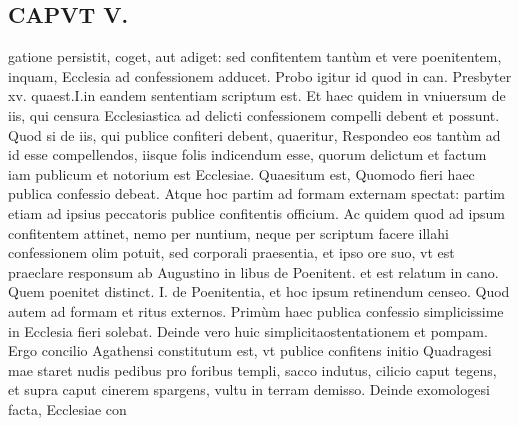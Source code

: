 \documentclass{article}
\begin{document}
\begin{pages}
\section*{CAPVT  V. }
\marginpar{[ p.323 ]}\pstart gatione persistit, coget, aut adiget: sed confitentem tantùm et vere poenitentem, inquam, Ecclesia ad confessionem adducet. Probo igitur id quod in can. Presbyter xv. quaest.I.in eandem sententiam scriptum est. Et haec quidem in vniuersum de iis, qui censura Ecclesiastica ad delicti confessionem compelli debent et possunt. Quod si de iis, qui publice confiteri debent, quaeritur, Respondeo eos tantùm ad id esse compellendos, iisque folis indicendum esse, quorum delictum et factum iam publicum et notorium est Ecclesiae.  \pend\pstart Quaesitum est, Quomodo fieri haec publica confessio debeat. Atque hoc partim ad formam externam spectat: partim etiam ad ipsius peccatoris publice confitentis officium. Ac quidem quod ad ipsum confitentem attinet, nemo per nuntium, neque per scriptum facere illahi confessionem olim potuit, sed corporali praesentia, et ipso ore suo, vt est praeclare responsum ab Augustino in libus  de Poenitent. et est relatum in cano. Quem poenitet distinct. I. de Poenitentia, et hoc ipsum retinendum censeo.  \pend\pstart Quod autem ad formam et ritus externos. Primùm haec publica confessio simplicissime in Ecclesia fieri solebat. Deinde vero huic simplicitaostentationem et pompam. Ergo concilio Agathensi constitutum est, vt publice confitens initio Quadragesi mae staret nudis pedibus pro foribus templi, sacco indutus, cilicio caput tegens, et supra caput cinerem spargens, vultu in terram demisso. Deinde exomologesi facta, Ecclesiae con\pend

\end{pages}
\end{document}
